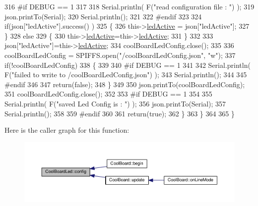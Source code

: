 \begin{DoxyCode}
316 \textcolor{preprocessor}{        #if DEBUG == 1}
317     
318             Serial.println( F(\textcolor{stringliteral}{"read configuration file : "}) );
319             json.printTo(Serial);
320             Serial.println();
321         
322 \textcolor{preprocessor}{        #endif}
323   
324             \textcolor{keywordflow}{if}(json[\textcolor{stringliteral}{"ledActive"}].success() )
325             \{
326                 this->\hyperlink{classCoolBoardLed_a5f17c135516fcf4b44ea8a096ba0177a}{ledActive} = json[\textcolor{stringliteral}{"ledActive"}]; 
327             \}
328             \textcolor{keywordflow}{else}
329             \{
330                 this->\hyperlink{classCoolBoardLed_a5f17c135516fcf4b44ea8a096ba0177a}{ledActive}=this->\hyperlink{classCoolBoardLed_a5f17c135516fcf4b44ea8a096ba0177a}{ledActive};          
331             \}
332             
333             json[\textcolor{stringliteral}{"ledActive"}]=this->\hyperlink{classCoolBoardLed_a5f17c135516fcf4b44ea8a096ba0177a}{ledActive};
334             coolBoardLedConfig.close();
335             
336             coolBoardLedConfig = SPIFFS.open(\textcolor{stringliteral}{"/coolBoardLedConfig.json"}, \textcolor{stringliteral}{"w"});
337             \textcolor{keywordflow}{if}(!coolBoardLedConfig)
338             \{
339             
340 \textcolor{preprocessor}{            #if DEBUG == 1 }
341 
342                 Serial.println( F(\textcolor{stringliteral}{"failed to write to /coolBoardLedConfig.json"}) );
343                 Serial.println();
344 
345 \textcolor{preprocessor}{            #endif}
346 
347                 \textcolor{keywordflow}{return}(\textcolor{keyword}{false});          
348             \}
349 
350             json.printTo(coolBoardLedConfig);
351             coolBoardLedConfig.close();
352 
353 \textcolor{preprocessor}{        #if DEBUG == 1}
354     
355             Serial.println( F(\textcolor{stringliteral}{"saved Led Config is : "}) );
356             json.printTo(Serial);
357             Serial.println();
358 
359 \textcolor{preprocessor}{        #endif}
360 
361             \textcolor{keywordflow}{return}(\textcolor{keyword}{true}); 
362         \}
363     \}   
364 
365 \}               
\end{DoxyCode}
Here is the caller graph for this function\+:\nopagebreak
\begin{figure}[H]
\begin{center}
\leavevmode
\includegraphics[width=350pt]{classCoolBoardLed_a1b60e5e30bea96c49ed62ed1bf1ffc8b_icgraph}
\end{center}
\end{figure}
\mbox{\label{classCoolBoardLed_a69f323359e0c9f797422f2152b5d41ef}} 
